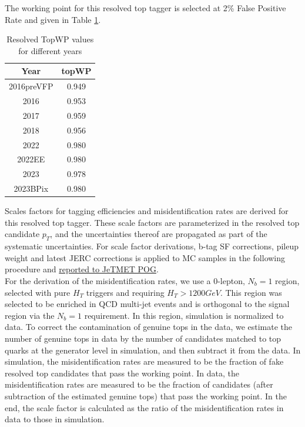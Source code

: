 \documentclass[twoside]{article}
\begin{document}
The working point for this resolved top tagger is selected at 2\% False Positive Rate and given in Table \ref{tab:topWP}.


\begin{table}[h]
\centering
\begin{tabular}{|c|c|}
\hline
\textbf{Year} & \textbf{topWP} \\ 
\hline
2016preVFP  & 0.949  \\
2016     & 0.953  \\
2017     & 0.959  \\
2018     & 0.956  \\
2022     & 0.980 \\
2022EE   & 0.980  \\
2023     & 0.978  \\
2023BPix & 0.980 \\
\hline
\end{tabular}
\caption{Resolved TopWP values for different years}
\label{tab:topWP}
\end{table}

Scales factors for tagging efficiencies and misidentification rates are derived for this resolved top tagger. These scale factors are parameterized in the resolved top candidate $p_{T}$, and the uncertainties thereof are propagated as part of the systematic uncertainties. For scale factor derivations, b-tag SF corrections, pileup weight and latest JERC corrections is applied to MC samples in the following procedure and \href{https://indico.cern.ch/event/1458097/#16-xgboost-top-tagger-for-inte}{reported to JeTMET POG}.\\

For the derivation of the misidentification rates, we use a 0-lepton, $N_{b}=1$ region, selected with pure $H_{T}$ triggers and requiring $H_{T}>1200 GeV$. This region was selected to be enriched in QCD multi-jet events and is orthogonal to the signal region via the $N_{b}=1$ requirement. In this region, simulation is normalized to data. To correct the contamination of genuine tops in the data, we estimate the number of genuine tops in data by the number of candidates matched to top quarks at the generator level in simulation, and then subtract it from the data. In simulation, the misidentification rates are measured to be the fraction of fake resolved top candidates that pass the working point. In data, the misidentification rates are measured to be the fraction of candidates (after subtraction of the estimated genuine tops) that pass the working point. In the end, the scale factor is calculated as the ratio of the misidentification rates in data to those in simulation.
\end{document}
